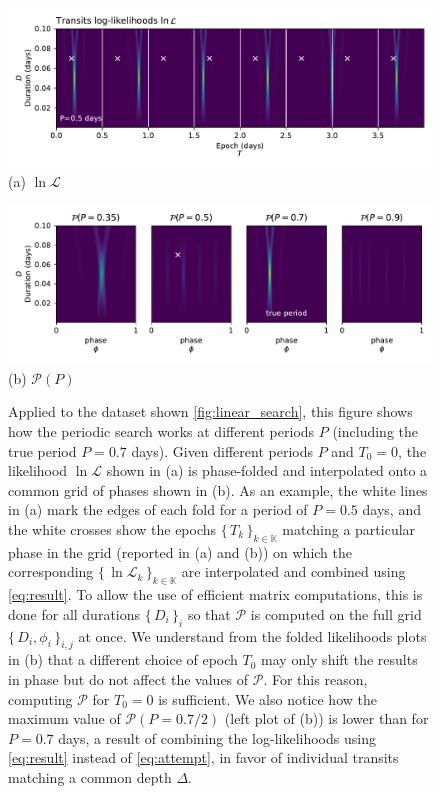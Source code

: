 \documentclass[modern]{aastex631}
\newcommand{\set}[1]{\{\,#1\,\}}
\begin{document}
\begin{figure}[H]
    \centering
    \includegraphics[width=\linewidth]{../workflows/principle/figures/principle_periodic_0.pdf}\\
    {(a) $\ln \mathcal{L}$}
\end{figure}

\begin{figure}[H]
    \centering
    \includegraphics[width=\linewidth]{../workflows/principle/figures/principle_periodic_1.pdf}\\
    {(b) $\mathcal{P}(P)$}

    \caption{Applied to the dataset shown \autoref{fig:linear_search}, this figure shows how the periodic search works at different periods $P$ (including the true period $P = 0.7$ days). Given different periods $P$ and $T_0=0$, the likelihood $\ln\mathcal{L}$ shown in (a) is phase-folded and interpolated onto a common grid of phases shown in (b). As an example, the white lines in (a) mark the edges of each fold for a period of $P=0.5$ days, and the white crosses show the epochs $\set{T_k}_{k\in\mathbb{K}}$ matching a particular phase in the grid (reported in (a) and (b)) on which the corresponding $\set{\ln \mathcal{L}_k}_{k\in\mathbb{K}}$ are interpolated and combined using \autoref{eq:result}. To allow the use of efficient matrix computations, this is done for all durations $\set{D_i}_i$ so that $\mathcal{P}$ is computed on the full grid $\set{D_i, \phi_i}_{i, j}$ at once. We understand from the folded likelihoods plots in (b) that a different choice of epoch $T_0$ may only shift the results in phase but do not affect the values of $\mathcal{P}$. For this reason, computing $\mathcal{P}$ for $T_0=0$ is sufficient. We also notice how the maximum value of $\mathcal{P}(P=0.7/2)$ (left plot of (b)) is lower than for $P=0.7$ days, a result of combining the log-likelihoods using \autoref{eq:result} instead of \autoref{eq:attempt}, in favor of individual transits matching a common depth $\Delta$.}
    \label{fig:periodic_search}
\end{figure}
\end{document}
